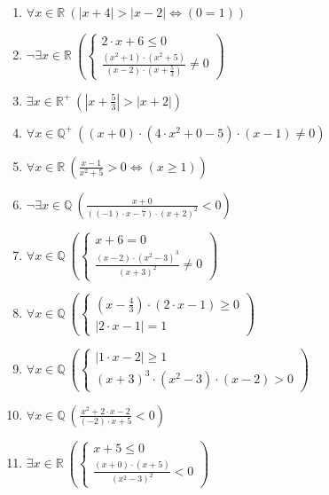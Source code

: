 \documentclass[11pt,a4paper]{article}
\begin{document}
\begin{enumerate}
\item $\displaystyle \forall x \in \mathbb{R}\ \left( \left|x + 4\right| > \left|x - 2\right| \iff \left( 0 = 1 \right) \right)$
\item $\displaystyle \lnot \exists x \in \mathbb{R}\ \left( \begin{cases} 2 \cdot x + 6 \le 0 \\ \frac{\left(x^{2} + 1\right) \cdot \left(x^{2} + 5\right)}{\left(x - 2\right) \cdot \left(x + \frac{5}{3}\right)} \neq 0 \end{cases} \right)$
\item $\displaystyle \exists x \in \mathbb{R}^{+}\ \left( \left|x + \frac{5}{3}\right| > \left|x + 2\right| \right)$
\item $\displaystyle \forall x \in \mathbb{Q}^{+}\ \left( \left(x + 0\right) \cdot \left(4 \cdot x^{2} + 0 - 5\right) \cdot \left(x - 1\right) \neq 0 \right)$
\item $\displaystyle \forall x \in \mathbb{R}\ \left( \frac{x - 1}{x^{2} + 5} > 0 \iff \left( x \ge 1 \right) \right)$
\item $\displaystyle \lnot \exists x \in \mathbb{Q}\ \left( \frac{x + 0}{\left(\left(-1\right) \cdot x - 7\right) \cdot \left(x + 2\right)^{2}} < 0 \right)$
\item $\displaystyle \forall x \in \mathbb{Q}\ \left( \begin{cases} x + 6 = 0 \\ \frac{\left(x - 2\right) \cdot \left(x^{2} - 3\right)^{3}}{\left(x + 3\right)^{2}} \neq 0 \end{cases} \right)$
\item $\displaystyle \forall x \in \mathbb{Q}\ \left( \begin{cases} \left(x - \frac{4}{3}\right) \cdot \left(2 \cdot x - 1\right) \ge 0 \\ \left|2 \cdot x - 1\right| = 1 \end{cases} \right)$
\item $\displaystyle \forall x \in \mathbb{Q}\ \left( \begin{cases} \left|1 \cdot x - 2\right| \ge 1 \\ \left(x + 3\right)^{3} \cdot \left(x^{2} - 3\right) \cdot \left(x - 2\right) > 0 \end{cases} \right)$
\item $\displaystyle \forall x \in \mathbb{Q}\ \left( \frac{x^{2} + 2 \cdot x - 2}{\left(-2\right) \cdot x + 5} < 0 \right)$
\item $\displaystyle \exists x \in \mathbb{R}\ \left( \begin{cases} x + 5 \le 0 \\ \frac{\left(x + 0\right) \cdot \left(x + 5\right)}{\left(x^{2} - 3\right)^{2}} < 0 \end{cases} \right)$

\end{enumerate}
\end{document}
